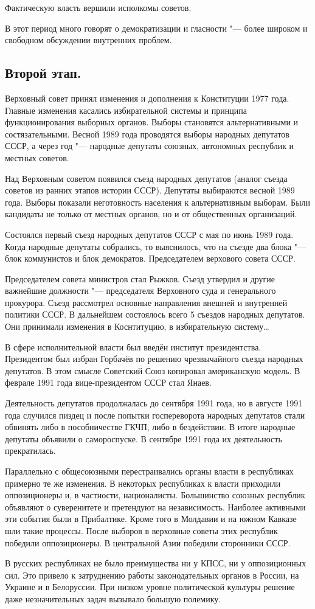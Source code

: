 \documentclass{article}
\begin{document}
Фактическую власть вершили исполкомы советов.

В этот период много говорят о демократизации и гласности "--- более широком и свободном обсуждении внутренних проблем.

\subsection{Второй этап.}
Верховный совет принял изменения и дополнения к Конституции 1977 года. Главные изменения касались избирательной системы и принципа функционирования выборных органов. Выборы становятся альтернативными и состязательными. Весной 1989 года проводятся выборы народных депутатов СССР, а через год "--- народные депутаты союзных, автономных республик и местных советов.

Над Верховным советом появился съезд народных депутатов (аналог съезда советов из ранних этапов истории СССР). Депутаты выбираются весной 1989 года. Выборы показали неготовность населения к альтернативным выборам. Были кандидаты не только от местных органов, но и от общественных организаций.

Состоялся первый съезд народных депутатов СССР с мая по июнь 1989 года. Когда народные депутаты собрались, то выяснилось, что на  съезде два блока "--- блок коммунистов и блок демократов. Председателем верхового совета СССР.

Председателем совета министров стал Рыжков. Съезд утвердил и другие важнейшие должности "--- председателя Верховного суда и генерального прокурора. Съезд рассмотрел основные направления внешней и внутренней политики СССР. В дальнейшем состоялось всего 5 съездов народных депутатов. Они принимали изменения в Коснтитуцию, в избирательную систему\dots

В сфере исполнительной власти был введён институт президентства. Президентом был избран Горбачёв по решению чрезвычайного съезда народных депутатов. В этом смысле Советский Союз копировал американскую модель. В феврале 1991 года вице-президентом СССР стал Янаев.

Деятельность депутатов продолжалась до сентября 1991 года, но в августе 1991 года случился пиздец и после попытки госпереворота народных депутатов стали обвинять либо в пособничестве ГКЧП, либо в бездействии. В итоге народные депутаты объявили о самороспуске. В сентябре 1991 года их деятельность прекратилась.

Параллельно с общесоюзными перестраивались органы власти в республиках примерно те же изменения. В некоторых республиках к власти приходили оппозиционеры и, в частности, националисты. Большинство союзных республик объявляют о суверенитете и претендуют на независимость. Наиболее активными эти события были в Прибалтике. Кроме того в Молдавии и на южном Кавказе шли такие процессы. После выборов в верховные советы этих республик победили оппозиционеры. В центральной Азии победили сторонники СССР.

В русских республиках не было преимущества ни у КПСС, ни у оппозиционных сил. Это привело к затруднению работы законодательных органов в России, на Украине и в Белоруссии. При низком уровне политической культуры решение даже незначительных задач вызывало большую полемику.
\end{document}
